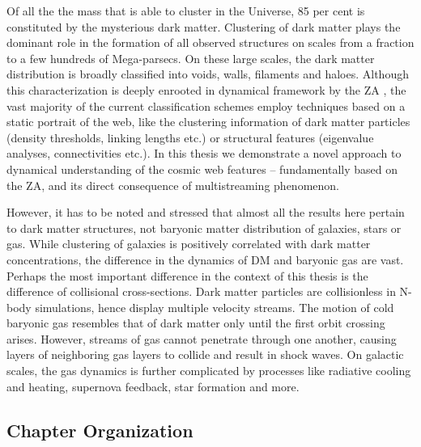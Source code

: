 Of all the the mass that is able to cluster in the Universe, 85 per cent is constituted by the mysterious dark matter. Clustering of dark matter plays the dominant role in the formation of all observed structures on scales from a fraction to a few hundreds of Mega-parsecs. On these large scales, the dark matter distribution is broadly classified into voids, walls, filaments and haloes. Although this characterization is deeply enrooted in dynamical framework by the ZA \citep{Zeldovich1970, Shandarin1989}, the vast majority of the current classification schemes employ techniques based on a static portrait of the web, like the clustering information of dark matter particles (density thresholds, linking lengths etc.) or structural features (eigenvalue analyses, connectivities etc.). In this thesis we demonstrate a novel approach to dynamical understanding of the cosmic web features -- fundamentally based on the ZA, and its direct consequence of multistreaming phenomenon.   

However, it has to be noted and stressed that almost all the results here pertain to dark matter structures, not baryonic matter distribution of galaxies, stars or gas. While clustering of galaxies is positively correlated with dark matter concentrations, the difference in the dynamics of DM and baryonic gas are vast. Perhaps the most important difference in the context of this thesis is the difference of collisional cross-sections. Dark matter particles are collisionless in N-body simulations, hence display multiple velocity streams. The motion of cold baryonic gas resembles that of dark matter only until the first orbit crossing arises. However, streams of gas cannot penetrate through one another, causing layers of neighboring gas layers to collide and result in shock waves. On galactic scales, the gas dynamics is further complicated by processes like radiative cooling and heating, supernova feedback, star formation and more. 


\subsection{Chapter Organization}


